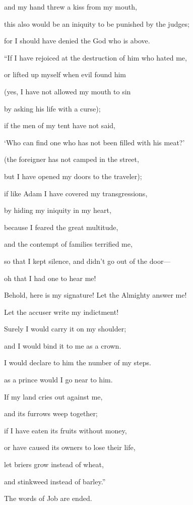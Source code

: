 {\par }{\QB and my hand threw a kiss from my mouth,
\par }{\Q {}this also would be an iniquity to be punished by the judges;
\par }{\QB for I should have denied the God who is above.
\par }{\Q {}“If I have rejoiced at the destruction of him who hated me,
\par }{\QB or lifted up myself when evil found him
\par }{\Q {}(yes, I have not allowed my mouth to sin
\par }{\QB by asking his life with a curse);
\par }{\Q {}if the men of my tent have not said,
\par }{\QB ‘Who can find one who has not been filled with his meat?’
\par }{\Q {}(the foreigner has not camped in the street,
\par }{\QB but I have opened my doors to the traveler);
\par }{\Q {}if like Adam I have covered my transgressions,
\par }{\QB by hiding my iniquity in my heart,
\par }{\Q {}because I feared the great multitude,
\par }{\QB and the contempt of families terrified me,
\par }{\QB so that I kept silence, and didn’t go out of the door—
\par }{\Q {}oh that I had one to hear me!
\par }{\QB Behold, here is my signature! Let the Almighty answer me!
\par }{\QB Let the accuser write my indictment!
\par }{\Q {}Surely I would carry it on my shoulder;
\par }{\QB and I would bind it to me as a crown.
\par }{\Q {}I would declare to him the number of my steps.
\par }{\QB as a prince would I go near to him.
\par }{\Q {}If my land cries out against me,
\par }{\QB and its furrows weep together;
\par }{\Q {}if I have eaten its fruits without money,
\par }{\QB or have caused its owners to lose their life,
\par }{\Q {}let briers grow instead of wheat,
\par }{\QB and stinkweed instead of barley.”
\par }{\BB \par }{\PP The words of Job are ended.

}
